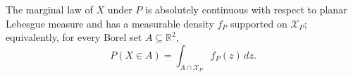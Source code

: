 The marginal law of \(X\) under \(P\) is absolutely continuous with respect to planar Lebesgue measure and has a measurable density \(f_P\) supported on \(\mathcal X_P\); equivalently, for every Borel set \(A\subseteq\mathbb R^2\),
\[
 P(X\in A)=\int_{A\cap\mathcal X_P}f_P(z)\,dz.
\]
